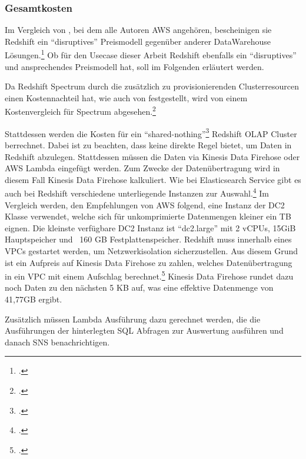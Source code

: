 \subsubsection{Gesamtkosten}
Im Vergleich von \citeauthor{Gupta.2015}, bei dem alle Autoren \ac{AWS} angehören, bescheinigen sie Redshift ein \enquote{disruptives} Preismodell gegenüber anderer DataWarehouse Lösungen.\footcite[Vgl.][]{Gupta.2015} Ob für den Usecase dieser Arbeit Redshift ebenfalls ein \enquote{disruptives} und ansprechendes Preismodell hat, soll im Folgenden erläutert werden.

Da Redshift Spectrum durch die zusätzlich zu provisionierenden Clusterresourcen einen Kostennachteil hat, wie auch von \citeauthor{Tan.2019} festgestellt, wird von einem Kostenvergleich für Spectrum abgesehen.\footcite[Vgl.][2178]{Tan.2019}

Stattdessen werden die Kosten für ein \enquote{shared-nothing}\footcite[Vgl.][2172]{Tan.2019} Redshift \ac{OLAP} Cluster berrechnet. Dabei ist zu beachten, dass \AWSIOT{} keine direkte Regel bietet, um Daten in Redshift abzulegen. Stattdessen müssen die Daten via Kinesis Data Firehose oder \ac{AWS} Lambda eingefügt werden. Zum Zwecke der Datenübertragung wird in diesem Fall Kinesis Data Firehose kalkuliert. Wie bei Elasticsearch Service gibt es auch bei Redshift verschiedene unterliegende Instanzen zur Auswahl.\footcite[Vgl. auch im Folgenden][]{AmazonWebServicesInc..o.J.z} Im Vergleich werden, den Empfehlungen von \ac{AWS} folgend, eine Instanz der \ac{DC2} Klasse verwendet, welche sich für unkomprimierte Datenmengen kleiner ein TB eignen. Die kleinste verfügbare \ac{DC2} Instanz ist \enquote{dc2.large} mit 2 vCPUs, 15GiB Hauptspeicher und ~160 GB Festplattenspeicher. Redshift muss innerhalb eines \acp{VPC} gestartet werden, um Netzwerkisolation sicherzustellen. Aus diesem Grund ist ein Aufpreis auf Kinesis Data Firehose zu zahlen, welches Datenübertragung in ein \ac{VPC} mit einem Aufschlag berechnet.\footcite[Vgl. auch im Folgenden][]{AmazonWebServicesInc..o.J.y} Kinesis Data Firehose rundet dazu noch Daten zu den nächsten 5 KB auf, was eine effektive Datenmenge von 41,77GB ergibt.

Zusätzlich müssen Lambda Ausführung dazu gerechnet werden, die die Ausführungen der hinterlegten \ac{SQL} Abfragen zur Auswertung ausführen und danach \ac{SNS} benachrichtigen.

